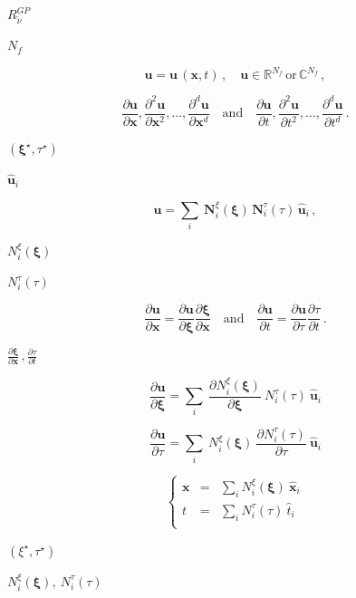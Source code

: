 \documentclass{article}
\begin{document}
$ R_{\tilde{\nu}}^{GP} $
\pagebreak

$N_f$
\pagebreak

\[ \mathbf{u} = \mathbf{u}\, (\mathbf{x}, t)\,, \quad \mathbf{u} \in \mathbb{R}^{N_f}\, \mbox{or}\, \mathbb{C}^{N_f}\,,\]
\pagebreak

\[ \frac{\partial \mathbf{u}}{\partial \mathbf{x}}, \frac{\partial^2 \mathbf{u}}{\partial \mathbf{x}^2}, \dots, \frac{\partial^d \mathbf{u}}{\partial \mathbf{x}^d} \quad \mbox{and} \quad \frac{\partial \mathbf{u}}{\partial t}, \frac{\partial^2 \mathbf{u}}{\partial t^2}, \dots, \frac{\partial^d \mathbf{u}}{\partial t^d}\,.\]
\pagebreak

$(\boldsymbol{\xi}^{\star}, \tau^{\star})$
\pagebreak

$\hat{\mathbf{u}}_i$
\pagebreak

\[ \mathbf{u} = \sum_i\ \mathbf{N}_i^{\xi}(\boldsymbol{\xi})\, \mathbf{N}_i^{\tau} (\tau)\, \hat{\mathbf{u}}_i\,,\]
\pagebreak

$N_i^{\xi}(\boldsymbol{\xi})$
\pagebreak

$N_i^{\tau}(\tau)$
\pagebreak

\[ \frac{\partial \mathbf{u}}{\partial \mathbf{x}} = \frac{\partial \mathbf{u}}{\partial \boldsymbol{\xi}} \frac{\partial \boldsymbol{\xi}}{\partial \mathbf{x}} 
\quad \mbox{and} \quad 
\frac{\partial \mathbf{u}}{\partial t} = \frac{\partial \mathbf{u}}{\partial \tau} \frac{\partial \tau}{\partial t}\,.\]
\pagebreak

$\frac{\partial \boldsymbol{\xi}}{\partial \mathbf{x}}\,, \frac{\partial \tau}{\partial t}$
\pagebreak

\[ \frac{\partial \mathbf{u}}{\partial \boldsymbol{\xi}} = \sum_i\ \frac{\partial N_i^{\xi}(\boldsymbol{\xi})}{\partial \boldsymbol{\xi}}\ N_i^{\tau}(\tau)\ \hat{\mathbf{u}}_i \]
\pagebreak

\[ \frac{\partial \mathbf{u}}{\partial \tau} = \sum_i\ N_i^{\xi}(\boldsymbol{\xi})\ \frac{\partial N_i^{\tau}(\tau)}{\partial \tau}\ \hat{\mathbf{u}}_i \]
\pagebreak

\[ \left\{ 
\begin{array}{lll}
\mathbf{x} & = & \sum_i N_i^{\xi}(\boldsymbol{\xi})\ \hat{\mathbf{x}}_i\\[5pt]
t & = & \sum_i N_i^{\tau}(\tau)\ \hat{t}_i\\
\end{array}
\right. \]
\pagebreak

$ (\xi^{\star}, \tau^{\star}) $
\pagebreak

$ N_i^{\xi} (\boldsymbol{\xi}),\ N_i^{\tau}(\tau) $
\pagebreak
\end{document}
